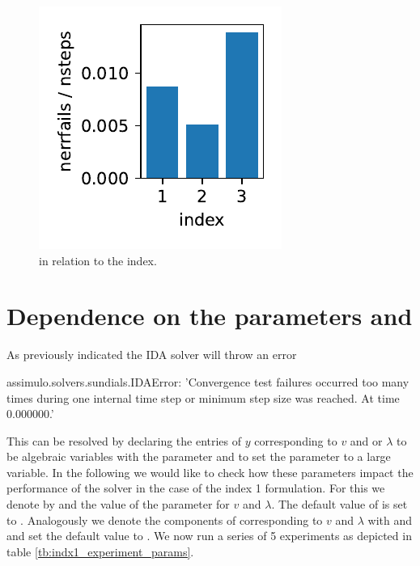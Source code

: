 \documentclass{report}
\begin{document}
\begin{figure}[h]
\centering
\begin{minipage}[b]{0.3\textwidth}
\centering
\includegraphics[width=\textwidth]{../Plots/Project2_main/Figure_612}
\caption{ in relation to the index.}
\label{pl:nerrfails_nsteps_indx123}
\end{minipage}
\end{figure}

\section*{Dependence on the parameters  and }

As previously indicated the IDA solver will throw an error
\begin{python}
assimulo.solvers.sundials.IDAError: 'Convergence test failures occurred too many times during one internal time step or minimum step size was reached. At time 0.000000.'
\end{python}
This can be resolved by declaring the entries of $y$ corresponding to $v$ and or $\lambda$ to be algebraic variables with the parameter  and to set the parameter  to a large variable. In the following we would like to check how these parameters impact the performance of the solver in the case of the index 1 formulation. For this we denote by  and  the value of the  parameter for $v$ and $\lambda$. The default value of  is set to . Analogously we denote the components of  corresponding to $v$ and $\lambda$ with  and  and set the default value to . We now run a series of 5 experiments as depicted in table \ref{tb:indx1_experiment_params}.
\end{document}
